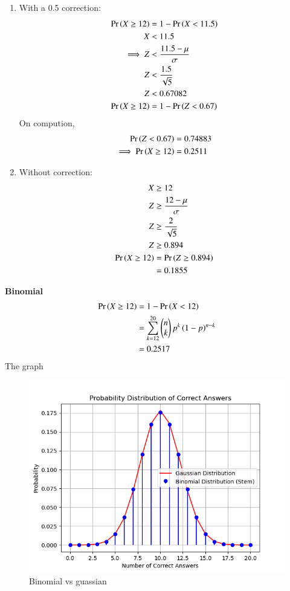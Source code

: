 \documentclass[journal,12pt,twocolumn]{IEEEtran}
\theoremstyle{remark}
\begin{document}
\begin{enumerate}
\item With a 0.5 correction:
\begin{align}
\Pr\left(X \ge 12\right) &= 1-\Pr\left(X<11.5\right)\\
X&<11.5\\ 
\implies Z &< \frac{11.5-\mu}{\sigma}\\
Z &< \frac{1.5}{\sqrt{5}}\\
Z &< 0.67082\\
\Pr\left(X \ge 12\right)&=1-\Pr\left(Z < 0.67\right)
\end{align}
On compution,
\begin{align}
\Pr\left(Z < 0.67\right)&=0.74883\\
\implies \Pr\left(X \ge 12\right)&= 0.2511
\end{align}
\item Without correction:
\begin{align}
X &\ge 12\\
Z &\ge \frac{12-\mu}{\sigma}\\
Z &\ge \frac{2}{\sqrt{5}}\\
Z &\ge 0.894\\
\Pr\left(X \ge 12\right)&=\Pr\left(Z \ge 0.894\right)\\
&=0.1855
\end{align}
\end{enumerate}
\textbf{Binomial}
\begin{align}
\Pr\left(X\ge12\right) &= 1 - \Pr\left(X<12\right) \\
&= \sum_{k=12}^{20}\begin{pmatrix}n\\k\end{pmatrix}p^k\left(1-p\right)^{n-k} \\
&= 0.2517
\end{align}
The graph\\
\begin{figure}[h]
\includegraphics[width=\columnwidth]{./figs/dist.png}
\caption{Binomial vs guassian}
\label{fig:BvG_py}
\end{figure}
\end{document}
